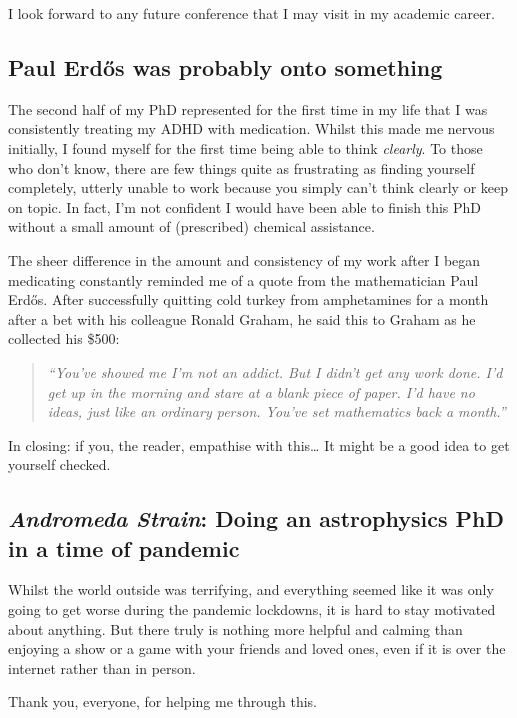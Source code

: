 I look forward to any future conference that I may visit in my academic career.

\subsection{Paul Erd\H{o}s was probably onto something}

The second half of my PhD represented for the first time in my life that I was consistently treating my ADHD with medication.
Whilst this made me nervous initially, I found myself for the first time being able to think \emph{clearly}.
To those who don't know, there are few things quite as frustrating as finding yourself completely, utterly unable to work because you simply can't think clearly or keep on topic.
In fact, I'm not confident I would have been able to finish this PhD without a small amount of (prescribed) chemical assistance.

The sheer difference in the amount and consistency of my work after I began medicating constantly reminded me of a quote from the mathematician Paul Erd\H{o}s.
After successfully quitting cold turkey from amphetamines for a month after a bet with his colleague Ronald Graham, he said this to Graham as he collected his \$500:

\begin{quote}
  \emph{
  \noindent
  ``You've showed me I'm not an addict. But I didn't get any work done. I'd get up in the morning and stare at a blank piece of paper. I'd have no ideas, just like an ordinary person. You've set mathematics back a month.''
  }
\end{quote}

\noindent
In closing: if you, the reader, empathise with this\ldots{} It might be a good idea to get yourself checked.

\subsection{\textit{Andromeda Strain}: Doing an astrophysics PhD in a time of pandemic}
\label{sec:pandemic}

Whilst the world outside was terrifying, and everything seemed like it was only going to get worse during the pandemic lockdowns, it is hard to stay motivated about anything.
But there truly is nothing more helpful and calming than enjoying a show or a game with your friends and loved ones, even if it is over the internet rather than in person.

\begin{center}
  Thank you, everyone, for helping me through this.
\end{center}

